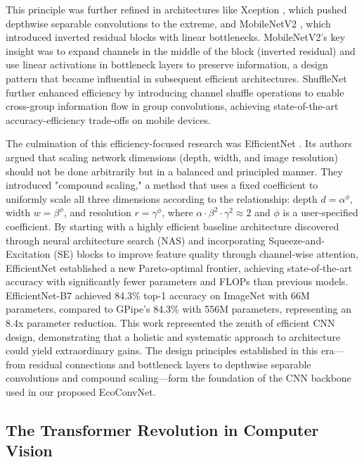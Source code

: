 \documentclass[12pt, a4paper]{article}
\begin{document}
This principle was further refined in architectures like Xception \cite{chollet2017xception}, which pushed depthwise separable convolutions to the extreme, and MobileNetV2 \cite{sandler2018mobilenetv2}, which introduced inverted residual blocks with linear bottlenecks. MobileNetV2's key insight was to expand channels in the middle of the block (inverted residual) and use linear activations in bottleneck layers to preserve information, a design pattern that became influential in subsequent efficient architectures. ShuffleNet \cite{zhang2018shufflenet} further enhanced efficiency by introducing channel shuffle operations to enable cross-group information flow in group convolutions, achieving state-of-the-art accuracy-efficiency trade-offs on mobile devices.

The culmination of this efficiency-focused research was EfficientNet \cite{tan2019efficientnet}. Its authors argued that scaling network dimensions (depth, width, and image resolution) should not be done arbitrarily but in a balanced and principled manner. They introduced "compound scaling," a method that uses a fixed coefficient to uniformly scale all three dimensions according to the relationship: depth $d = \alpha^\phi$, width $w = \beta^\phi$, and resolution $r = \gamma^\phi$, where $\alpha \cdot \beta^2 \cdot \gamma^2 \approx 2$ and $\phi$ is a user-specified coefficient. By starting with a highly efficient baseline architecture discovered through neural architecture search (NAS) \cite{zoph2018learning} and incorporating Squeeze-and-Excitation (SE) blocks \cite{hu2018squeeze} to improve feature quality through channel-wise attention, EfficientNet established a new Pareto-optimal frontier, achieving state-of-the-art accuracy with significantly fewer parameters and FLOPs than previous models. EfficientNet-B7 achieved 84.3\% top-1 accuracy on ImageNet with 66M parameters, compared to GPipe's 84.3\% with 556M parameters, representing an 8.4x parameter reduction. This work represented the zenith of efficient CNN design, demonstrating that a holistic and systematic approach to architecture could yield extraordinary gains. The design principles established in this era—from residual connections and bottleneck layers to depthwise separable convolutions and compound scaling—form the foundation of the CNN backbone used in our proposed EcoConvNet.




\subsection{The Transformer Revolution in Computer Vision}
\label{ssec:transformer_revolution}
\end{document}
